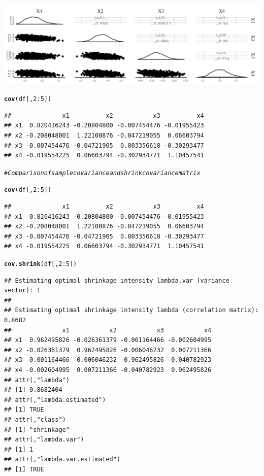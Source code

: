 \documentclass[11pt,a4paper,twoside]{book}\usepackage[]{graphicx}\usepackage[]{color}
\makeatletter
\newcommand{\hlnum}[1]{\textcolor[rgb]{0.686,0.059,0.569}{#1}}%
\newcommand{\hlcom}[1]{\textcolor[rgb]{0.678,0.584,0.686}{\textit{#1}}}%
\newcommand{\hlopt}[1]{\textcolor[rgb]{0,0,0}{#1}}%
\newcommand{\hlstd}[1]{\textcolor[rgb]{0.345,0.345,0.345}{#1}}%
\newcommand{\hlkwd}[1]{\textcolor[rgb]{0.737,0.353,0.396}{\textbf{#1}}}%
\newenvironment{kframe}{%
 \def\at@end@of@kframe{}%
 \ifinner\ifhmode%
  \def\at@end@of@kframe{\end{minipage}}%
  \begin{minipage}{\columnwidth}%
 \fi\fi%
 \def\FrameCommand##1{\hskip\@totalleftmargin \hskip-\fboxsep
 \colorbox{shadecolor}{##1}\hskip-\fboxsep
     \hskip-\linewidth \hskip-\@totalleftmargin \hskip\columnwidth}%
 \MakeFramed {\advance\hsize-\width
   \@totalleftmargin\z@ \linewidth\hsize
   \@setminipage}}%
 {\par\unskip\endMakeFramed%
 \at@end@of@kframe}
\newenvironment{knitrout}{}{} %
\makeatother
\begin{document}
\begin{knitrout}
{\centering \includegraphics[width=\textwidth-3cm]{figure/ch03_figcovuncertainty-1} 

}


\begin{kframe}\begin{alltt}
\hlkwd{cov}\hlstd{(df[,}\hlnum{2}\hlopt{:}\hlnum{5}\hlstd{])}
\end{alltt}
\begin{verbatim}
##              x1          x2           x3          x4
## x1  0.820416243 -0.20804800 -0.007454476 -0.01955423
## x2 -0.208048001  1.22100876 -0.047219055  0.06603794
## x3 -0.007454476 -0.04721905  0.803356618 -0.30293477
## x4 -0.019554225  0.06603794 -0.302934771  1.10457541
\end{verbatim}
\end{kframe}
\end{knitrout}

\begin{knitrout}
\color{fgcolor}\begin{kframe}
\begin{alltt}
\hlcom{#Comparison of sample covariance and shrink covariance matrix}

\hlkwd{cov}\hlstd{(df[,}\hlnum{2}\hlopt{:}\hlnum{5}\hlstd{])}
\end{alltt}
\begin{verbatim}
##              x1          x2           x3          x4
## x1  0.820416243 -0.20804800 -0.007454476 -0.01955423
## x2 -0.208048001  1.22100876 -0.047219055  0.06603794
## x3 -0.007454476 -0.04721905  0.803356618 -0.30293477
## x4 -0.019554225  0.06603794 -0.302934771  1.10457541
\end{verbatim}
\begin{alltt}
\hlkwd{cov.shrink}\hlstd{(df[,}\hlnum{2}\hlopt{:}\hlnum{5}\hlstd{])}
\end{alltt}
\begin{verbatim}
## Estimating optimal shrinkage intensity lambda.var (variance vector): 1 
## 
## Estimating optimal shrinkage intensity lambda (correlation matrix): 0.8682
##              x1           x2           x3           x4
## x1  0.962495826 -0.026361379 -0.001164466 -0.002604995
## x2 -0.026361379  0.962495826 -0.006046232  0.007211366
## x3 -0.001164466 -0.006046232  0.962495826 -0.040782923
## x4 -0.002604995  0.007211366 -0.040782923  0.962495826
## attr(,"lambda")
## [1] 0.8682404
## attr(,"lambda.estimated")
## [1] TRUE
## attr(,"class")
## [1] "shrinkage"
## attr(,"lambda.var")
## [1] 1
## attr(,"lambda.var.estimated")
## [1] TRUE
\end{verbatim}
\end{kframe}
\end{knitrout}
\end{document}
